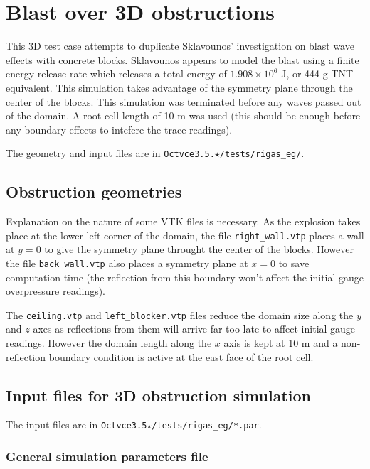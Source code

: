 \documentclass[pdftex, 12pt, a4paper]{report}
\begin{document}
\pagebreak

\section{Blast over 3D obstructions}\label{sec:Rigas}

This 3D test case attempts to duplicate Sklavounos' investigation \cite{Rigas:cs} on blast wave effects with concrete blocks.
Sklavounos appears to model the blast using a finite energy
release rate which releases a total energy of $1.908 \times 10^6$ J, or 444 g TNT equivalent. This simulation takes advantage of 
the symmetry plane through the center of the blocks.  This simulation was terminated before any waves passed out of the domain.
A root cell length of 10 m was used (this should be enough before any boundary effects to intefere the trace readings).

The geometry and input files are in \verb'Octvce3.5.'$\star$\verb'/tests/rigas_eg/'.

\subsection{Obstruction geometries}\label{sec:Rigas_geom}

Explanation on the nature of some VTK files is necessary.
As the explosion takes place at the lower left corner of the domain, the file \verb'right_wall.vtp' places a wall at $y = 0$
to give the symmetry plane throught the center of the blocks.  However the file \verb'back_wall.vtp' also places a
symmetry plane at $x = 0$ to save computation time (the reflection from this boundary won't affect the initial gauge overpressure
readings).

The \verb'ceiling.vtp' and \verb'left_blocker.vtp' files reduce the domain size along the $y$ and $z$ axes as 
reflections from them will arrive far too late to affect initial gauge readings.  However the domain length along the
$x$ axis is kept at 10 m and a non-reflection boundary condition is active at the east face of the root cell.

\subsection{Input files for 3D obstruction simulation}\label{sec:Rigas_par}

The input files are in \verb'Octvce3.5'$\star$\verb'/tests/rigas_eg/*.par'.  

\subsubsection{General simulation parameters file}
\end{document}
